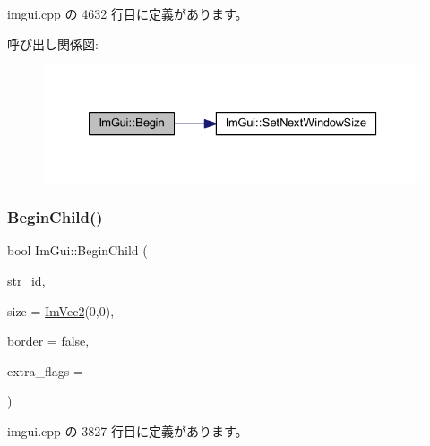  imgui.\+cpp の 4632 行目に定義があります。

呼び出し関係図\+:\nopagebreak
\begin{figure}[H]
\begin{center}
\leavevmode
\includegraphics[width=326pt]{namespace_im_gui_a288e01ff1c8102d6374a6b1e409b9878_cgraph}
\end{center}
\end{figure}
\mbox{\label{namespace_im_gui_a93b10a516e6da427b743906ad97d7f16}} 
\subsubsection{\texorpdfstring{Begin\+Child()}{BeginChild()}\hspace{0.1cm}{\footnotesize\ttfamily [1/2]}}
{\footnotesize\ttfamily bool Im\+Gui\+::\+Begin\+Child (\begin{DoxyParamCaption}\item[{const char $\ast$}]{str\+\_\+id,  }\item[{const \mbox{\hyperlink{struct_im_vec2}{Im\+Vec2}} \&}]{size = {\ttfamily \mbox{\hyperlink{struct_im_vec2}{Im\+Vec2}}(0,0)},  }\item[{bool}]{border = {\ttfamily false},  }\item[{\mbox{\hyperlink{imgui_8h_a0b8e067ab4f7a818828c8d89e531addc}{Im\+Gui\+Window\+Flags}}}]{extra\+\_\+flags = {} }\end{DoxyParamCaption})}



 imgui.\+cpp の 3827 行目に定義があります。

